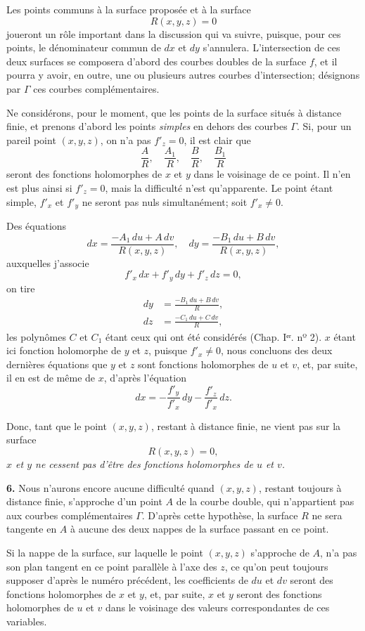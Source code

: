 \documentclass{article}
\begin{document}
Les points communs à la surface proposée et à la surface
\[
R(x, y, z) = 0
\]
joueront un rôle important dans la discussion qui va suivre, puisque, pour ces points, le dénominateur commun de $dx$ et $dy$ s'annulera. L'intersection de ces deux surfaces se composera d'abord des courbes doubles de la surface $f$, et il pourra y avoir, en outre, une ou plusieurs autres courbes d'intersection; désignons par $\Gamma$ ces courbes complémentaires.

Ne considérons, pour le moment, que les points de la surface situés à distance finie, et prenons d'abord les points \emph{simples} en dehors des courbes $\Gamma$. Si, pour un pareil point $(x, y, z)$, on n'a pas $f'_{z} = 0$, il est clair que
\[
\frac{A}{R}, \quad \frac{A_{1}}{R}, \quad \frac{B}{R}, \quad \frac{B_{1}}{R}
\]
seront des fonctions holomorphes de $x$ et $y$ dans le voisinage de ce point. Il n'en est plus ainsi si $f'_{z} = 0$, mais la difficulté n'est qu'apparente. Le point étant simple, $f'_{x}$ et $f'_{y}$ ne seront pas nuls simultanément; soit $f'_{x} \neq 0$.

Des équations
\[
dx = \frac{-A_{1}\,du + A\,dv}{R(x, y, z)}, \quad dy = \frac{-B_{1}\,du + B\,dv}{R(x, y, z)},
\]
auxquelles j'associe
\[
f'_{x}\,dx + f'_{y}\,dy + f'_{z}\,dz = 0,
\]
on tire
\[
\begin{aligned}
dy &= \frac{-B_{1}\,du + B\,dv}{R}, \\
dz &= \frac{-C_{1}\,du + C\,dv}{R},
\end{aligned}
\]
les polynômes $C$ et $C_{1}$ étant ceux qui ont été considérés (Chap. Iᵉʳ. nº 2).
$x$ étant ici fonction holomorphe de $y$ et $z$, puisque $f'_{x} \neq 0$, nous concluons des deux dernières équations que $y$ et $z$ sont fonctions holomorphes de $u$ et $v$, et, par suite, il en est de même de $x$, d'après l'équation
\[
dx = -\frac{f'_{y}}{f'_{x}}\,dy - \frac{f'_{z}}{f'_{x}}\,dz.
\]

Donc, tant que le point $(x, y, z)$, restant à distance finie, ne vient pas sur la surface
\[
R(x, y, z) = 0,
\]
\emph{$x$ et $y$ ne cessent pas d'être des fonctions holomorphes de $u$ et $v$.}

\textbf{6.} Nous n'aurons encore aucune difficulté quand $(x, y, z)$, restant toujours à distance finie, s'approche d'un point $A$ de la courbe double, qui n'appartient pas aux courbes complémentaires $\Gamma$. D'après cette hypothèse, la surface $R$ ne sera tangente en $A$ à aucune des deux nappes de la surface passant en ce point.

Si la nappe de la surface, sur laquelle le point $(x, y, z)$ s'approche de $A$, n'a pas son plan tangent en ce point parallèle à l'axe des $z$, ce qu'on peut toujours supposer d'après le numéro précédent, les coefficients de $du$ et $dv$ seront des fonctions holomorphes de $x$ et $y$, et, par suite, $x$ et $y$ seront des fonctions holomorphes de $u$ et $v$ dans le voisinage des valeurs correspondantes de ces variables.
\end{document}

